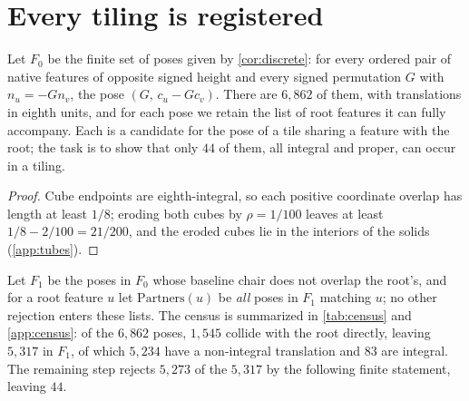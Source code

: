 \section{Every tiling is registered}\label{sec:registration}

Let $F_0$ be the finite set of poses given by \cref{cor:discrete}: for every ordered pair of
native features of opposite signed height and every signed permutation $G$ with $n_u=-Gn_v$, the
pose $(G,\,c_u-Gc_v)$. There are $6{,}862$ of them, with translations in eighth units, and for
each pose we retain the list of root features it can fully accompany. Each is a candidate for the
pose of a tile sharing a feature with the root; the task is to show that only $44$ of them, all
integral and proper, can occur in a tiling.


\begin{proof}
Cube endpoints are eighth-integral, so each positive coordinate overlap has length at least
$1/8$; eroding both cubes by $\rho=1/100$ leaves at least $1/8-2/100=21/200$, and the eroded cubes
lie in the interiors of the solids (\cref{app:tubes}).
\end{proof}

Let $F_1$ be the poses in $F_0$ whose baseline chair does not overlap the root's, and for a root
feature $u$ let $\mathrm{Partners}(u)$ be \emph{all} poses in $F_1$ matching $u$; no other
rejection enters these lists. The census is summarized in \cref{tab:census} and
\cref{app:census}: of the $6{,}862$ poses, $1{,}545$ collide with the root directly, leaving
$5{,}317$ in $F_1$, of which $5{,}234$ have a non-integral translation and $83$ are integral. The
remaining step rejects $5{,}273$ of the $5{,}317$ by the following finite statement, leaving $44$.

